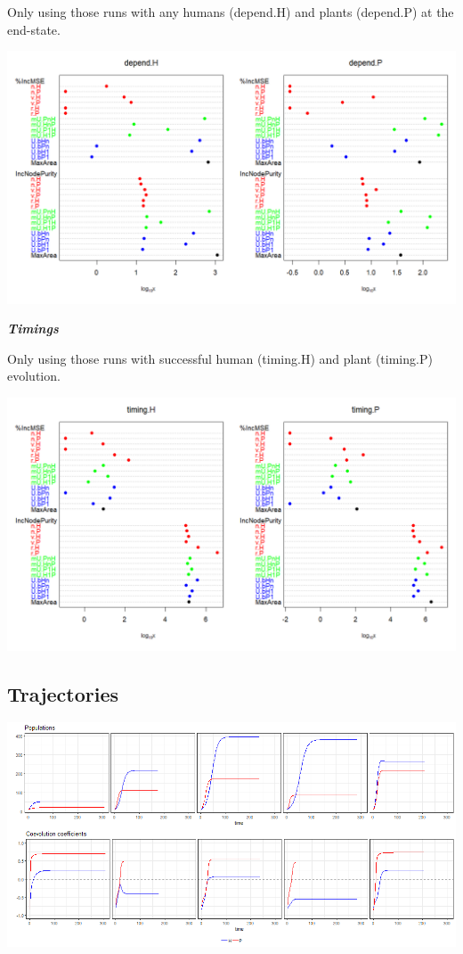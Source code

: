 \documentclass[]{book}
\begin{document}
Only using those runs with any humans (depend.H) and plants (depend.P) at the end-state.

\includegraphics[width=1\linewidth]{plots/5_multiplePar-RF-depend}

\textbf{\emph{Timings}}

Only using those runs with successful human (timing.H) and plant (timing.P) evolution.

\includegraphics[width=1\linewidth]{plots/5_multiplePar-RF-timing}

\newpage

\hypertarget{trajectories}{%
\subsection{Trajectories}\label{trajectories}}

\includegraphics[width=1\linewidth]{plots/5_multiplePar-pop_trajectories-ggplot}
\end{document}
